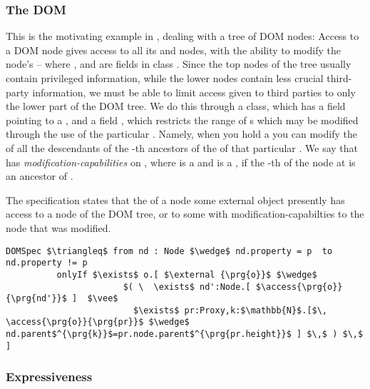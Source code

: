 \subsubsection{The DOM}  %
This is the motivating example in \cite{dd},
dealing with a tree of DOM nodes: Access to a DOM node
gives access to all its  and  nodes, with the ability to
modify the node's  -- where  ,  and 
are fields in class . Since the top nodes of the tree
usually contain privileged information, while the lower nodes contain
less crucial third-party information, we must be able to limit 
 access given to third parties to only the lower part of the DOM tree. We do this through a  class, which has a field  pointing to a , and a field , which restricts the range of s which may be modified through the use of the particular . Namely, when you hold a   you can modify the  of all the descendants of the    -th ancestors of the  of that particular .  We say that
 has \emph{modification-capabilities} on , where  is
a   and  is a , if the -th  
of the node at  is an ancestor of .


The specification  states that the  of a node 
some external object presently has 
access to a node of the DOM tree, or to some  with modification-capabilties
to the node that was modified.
\begin{lstlisting}[language = Chainmail, mathescape=true, frame=lines]
DOMSpec $\triangleq$ from nd : Node $\wedge$ nd.property = p  to nd.property != p
          onlyIf $\exists$ o.[ $\external {\prg{o}}$ $\wedge$ 
                       $( \  \exists$ nd':Node.[ $\access{\prg{o}}{\prg{nd'}}$ ]  $\vee$ 
                         $\exists$ pr:Proxy,k:$\mathbb{N}$.[$\, \access{\prg{o}}{\prg{pr}}$ $\wedge$ nd.parent$^{\prg{k}}$=pr.node.parent$^{\prg{pr.height}}$ ] $\,$ ) $\,$ ]
\end{lstlisting}

\subsubsection{Expressiveness}
 

